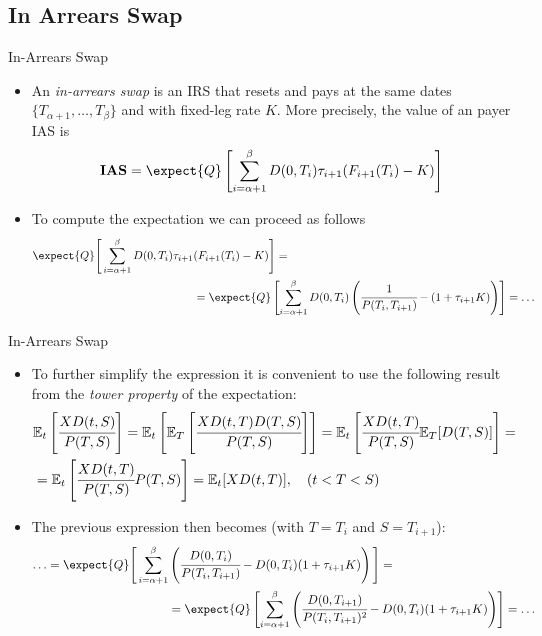 \documentclass{beamer}
\begin{document}
\subsection{In Arrears Swap}
\begin{frame}{In-Arrears Swap}
\begin{itemize}
\item<1-> An \emph{in-arrears swap} is an IRS that resets and pays at the same dates $\{T_{\alpha+1},\ldots, T_\beta\}$ and with fixed-leg rate $K$. More precisely, the value of an payer IAS is
\begin{equation}
\textbf{IAS}=\expect{Q}\left[\sum_{i=\alpha+1}^{\beta}D(0,T_i)\tau_{i+1}(F_{i+1}(T_i)-K)\right]
\end{equation}
\item<2-> To compute the expectation we can proceed as follows
\begin{equation*}
\begin{aligned}
\expect{Q}\Bigg[\sum_{i=\alpha+1}^{\beta}D(0,T_i)\tau_{i+1}&(F_{i+1}(T_i)-K)\Bigg] = \\ 
&=\expect{Q}\left[\sum_{i=\alpha+1}^{\beta}D(0,T_i)\left(\cfrac{1}{P(T_i,T_{i+1})}-(1+\tau_{i+1}K)\right)\right]=\ldots
\end{aligned}
\end{equation*}
\end{itemize}
\end{frame}

\begin{frame}{In-Arrears Swap}
\begin{itemize}
\item<1-> To further simplify the expression it is convenient to use the following result from the \emph{tower property} of the expectation:
\begin{equation*}
\begin{aligned}
&\mathbb{E}_t\left[\cfrac{XD(t,S)}{P(T,S)} \right]=\mathbb{E}_t\left[\mathbb{E}_T\left[\cfrac{XD(t,T)D(T,S)}{P(T,S)} \right]\right]=\mathbb{E}_t\left[\cfrac{XD(t,T)}{P(T,S)}\mathbb{E}_T[D(T,S)]\right]= \\ 
& =\mathbb{E}_t\left[\cfrac{XD(t,T)}{P(T,S)}P(T,S)\right]=\mathbb{E}_t[XD(t,T)],\quad (t<T<S)
\end{aligned}
\end{equation*}
\item<2-> The previous expression then becomes (with $T=T_i$ and $S=T_{i+1}$):
\begin{equation*}
\begin{aligned}
\ldots=\expect{Q}\Bigg[\sum_{i=\alpha+1}^{\beta}&\left(\cfrac{D(0,T_i)}{P(T_i,T_{i+1})}-D(0,T_i)(1+\tau_{i+1}K)\right)\Bigg] = \\
&=\expect{Q}\left[\sum_{i=\alpha+1}^{\beta}\left(\cfrac{D(0,T_{i+1})}{P(T_i,T_{i+1})^2}-D(0,T_i)(1+\tau_{i+1}K)\right)\right] = \ldots
\end{aligned}
\end{equation*}
\end{itemize}
\end{frame}
\end{document}

